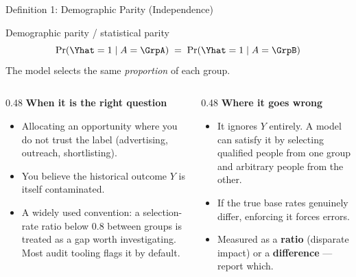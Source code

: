 \begin{frame}{Definition 1: Demographic Parity (Independence)}

    \begin{block}{Demographic parity / statistical parity}
        \[
            \Pr(\Yhat = 1 \mid A = \GrpA) \;=\; \Pr(\Yhat = 1 \mid A = \GrpB)
        \]
        The model selects the same \emph{proportion} of each group.
    \end{block}

    \vspace{0.6em}

    \begin{columns}[T]
        \begin{column}{0.48\textwidth}
            \textbf{When it is the right question}
            \begin{itemize}\small
                \setlength\itemsep{0.3em}
                \item Allocating an opportunity where you do not trust the label
                      (advertising, outreach, shortlisting).
                \item You believe the historical outcome $Y$ is itself contaminated.
                \item A widely used convention: a selection-rate ratio below $0.8$ between groups
                      is treated as a gap worth investigating. Most audit tooling flags it by
                      default.
            \end{itemize}
        \end{column}
        \begin{column}{0.48\textwidth}
            \textbf{Where it goes wrong}
            \begin{itemize}\small
                \setlength\itemsep{0.3em}
                \item It ignores $Y$ entirely. A model can satisfy it by selecting qualified people
                      from one group and arbitrary people from the other.
                \item If the true base rates genuinely differ, enforcing it forces errors.
                \item Measured as a \textbf{ratio} (disparate impact) or a \textbf{difference}
                      --- report which.
            \end{itemize}
        \end{column}
    \end{columns}
\end{frame}

